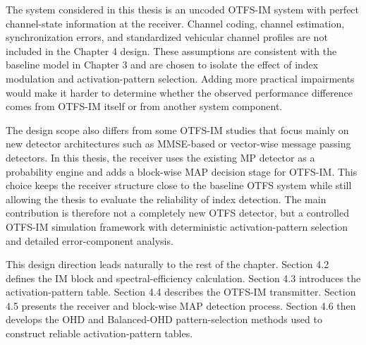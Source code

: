 The system considered in this thesis is an uncoded OTFS-IM system with perfect channel-state information at the receiver. Channel coding, channel estimation, synchronization errors, and standardized vehicular channel profiles are not included in the Chapter 4 design. These assumptions are consistent with the baseline model in Chapter 3 and are chosen to isolate the effect of index modulation and activation-pattern selection. Adding more practical impairments would make it harder to determine whether the observed performance difference comes from OTFS-IM itself or from another system component.

The design scope also differs from some OTFS-IM studies that focus mainly on new detector architectures such as MMSE-based or vector-wise message passing detectors. In this thesis, the receiver uses the existing MP detector as a probability engine and adds a block-wise MAP decision stage for OTFS-IM. This choice keeps the receiver structure close to the baseline OTFS system while still allowing the thesis to evaluate the reliability of index detection. The main contribution is therefore not a completely new OTFS detector, but a controlled OTFS-IM simulation framework with deterministic activation-pattern selection and detailed error-component analysis.

This design direction leads naturally to the rest of the chapter. Section 4.2 defines the IM block and spectral-efficiency calculation. Section 4.3 introduces the activation-pattern table. Section 4.4 describes the OTFS-IM transmitter. Section 4.5 presents the receiver and block-wise MAP detection process. Section 4.6 then develops the OHD and Balanced-OHD pattern-selection methods used to construct reliable activation-pattern tables.
